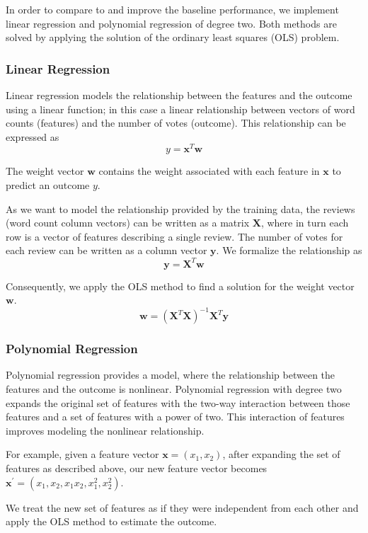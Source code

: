 In order to compare to and improve the baseline performance, we implement linear
regression and polynomial regression of degree two.  Both methods are solved by
applying the solution of the ordinary least squares (OLS) problem.

\subsubsection{Linear Regression}

Linear regression models the relationship between the features and the outcome
using a linear function; in this case a linear relationship between vectors of
word counts (features) and the number of votes (outcome).  This relationship can
be expressed as
\[
  y = \mathbf{x}^T\mathbf{w}
\]

The weight vector $\mathbf{w}$ contains the weight associated with each feature
in $\mathbf{x}$ to predict an outcome $y$.

As we want to model the relationship provided by the training data, the reviews
(word count column vectors) can be written as a matrix $\mathbf{X}$, where in
turn each row is a vector of features describing a single review.  The number of
votes for each review can be written as a column vector $\mathbf{y}$.  We
formalize the relationship as
\[
  \mathbf{y} = \mathbf{X}^T \mathbf{w}
\]

Consequently, we apply the OLS method to find a solution for the weight vector
$\mathbf{w}$.
\[
  \mathbf{w} = {(\mathbf{X}^T \mathbf{X})}^{-1} \mathbf{X}^T \mathbf{y}
\]

\subsubsection{Polynomial Regression}

Polynomial regression provides a model, where the relationship between the
features and the outcome is nonlinear.  Polynomial regression with degree two
expands the original set of features with the two-way interaction between those
features and a set of features with a power of two.  This interaction of
features improves modeling the nonlinear relationship.

For example, given a feature vector $\mathbf{x} = (x_1, x_2)$, after expanding
the set of features as described above, our new feature vector becomes
$\mathbf{x}^{'} = (x_1, x_2, x_1x_2, x_1^2, x_2^2)$.

We treat the new set of features as if they were independent from each other
and apply the OLS method to estimate the outcome.

